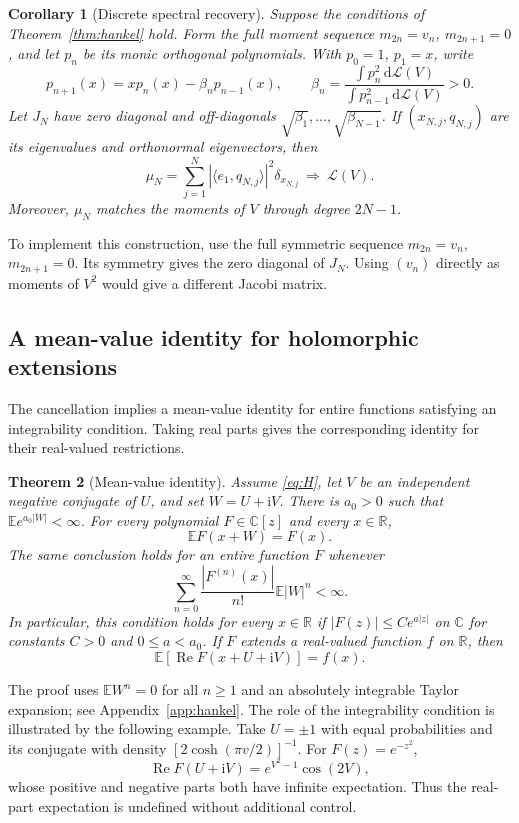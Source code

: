 \documentclass[11pt,twoside]{article}
\theoremstyle{journalplain}
\numberwithin{equation}{section}
\newtheorem{theorem}{Theorem}[section]
\newtheorem{corollary}[theorem]{Corollary}
\theoremstyle{journaldefinition}
\newcommand{\R}{\mathbb R}
\newcommand{\C}{\mathbb C}
\newcommand{\E}{\mathbb E}
\newcommand{\dd}{\,\mathrm d}
\newcommand{\ii}{\mathrm i}
\newcommand{\Law}{\mathcal L}
\begin{document}
\begin{corollary}[Discrete spectral recovery]\label{cor:jacobi}
Suppose the conditions of Theorem~\ref{thm:hankel} hold. Form the full moment sequence $m_{2n}=v_n$, $m_{2n+1}=0$, and let $p_n$ be its monic orthogonal polynomials. With $p_0=1$, $p_1=x$, write
\[
 p_{n+1}(x)=xp_n(x)-\beta_n p_{n-1}(x),\qquad
 \beta_n=\frac{\int p_n^2\dd\Law(V)}{\int p_{n-1}^2\dd\Law(V)}>0.
\]
Let $J_N$ have zero diagonal and off-diagonals $\sqrt{\beta_1},\ldots,\sqrt{\beta_{N-1}}$. If $(x_{N,j},q_{N,j})$ are its eigenvalues and orthonormal eigenvectors, then
\begin{equation}\label{eq:jacobi}
 \mu_N=\sum_{j=1}^N|\langle e_1,q_{N,j}\rangle|^2\delta_{x_{N,j}}
 \ \Longrightarrow\ \Law(V).
\end{equation}
Moreover, $\mu_N$ matches the moments of $V$ through degree $2N-1$.
\end{corollary}
To implement this construction, use the full symmetric sequence $m_{2n}=v_n$, $m_{2n+1}=0$. Its symmetry gives the zero diagonal of $J_N$. Using $(v_n)$ directly as moments of $V^2$ would give a different Jacobi matrix.

\subsection{A mean-value identity for holomorphic extensions}
The cancellation implies a mean-value identity for entire functions satisfying an integrability condition. Taking real parts gives the corresponding identity for their real-valued restrictions.

\begin{theorem}[Mean-value identity]\label{thm:mean-value}
Assume \eqref{eq:H}, let $V$ be an independent negative conjugate of $U$, and set $W=U+\ii V$. There is $a_0>0$ such that $\E e^{a_0|W|}<\infty$. For every polynomial $F\in\C[z]$ and every $x\in\R$,
\begin{equation}\label{eq:mean-value-complex}
 \E F(x+W)=F(x).
\end{equation}
The same conclusion holds for an entire function $F$ whenever
\begin{equation}\label{eq:taylor-integrability}
 \sum_{n=0}^{\infty}\frac{|F^{(n)}(x)|}{n!}\E|W|^n<\infty.
\end{equation}
In particular, this condition holds for every $x\in\R$ if
$|F(z)|\le C e^{a|z|}$ on $\C$ for constants $C>0$ and $0\le a<a_0$.
If $F$ extends a real-valued function $f$ on $\R$, then
\begin{equation}\label{eq:mean-value-real}
 \boxed{\E\!\left[\operatorname{Re}F(x+U+\ii V)\right]=f(x).}
\end{equation}
\end{theorem}
The proof uses $\E W^n=0$ for all $n\ge1$ and an absolutely integrable Taylor expansion; see Appendix~\ref{app:hankel}. The role of the integrability condition is illustrated by the following example. Take $U=\pm1$ with equal probabilities and its conjugate with density $[2\cosh(\pi v/2)]^{-1}$. For $F(z)=e^{-z^2}$,
\[
 \operatorname{Re}F(U+\ii V)=e^{V^2-1}\cos(2V),
\]
whose positive and negative parts both have infinite expectation. Thus the real-part expectation is undefined without additional control.
\end{document}
